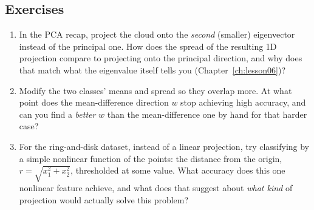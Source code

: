 \subsection*{Exercises}
\begin{enumerate}
  \item In the PCA recap, project the cloud onto the \emph{second} (smaller) eigenvector instead of the principal one. How does the spread of the resulting 1D projection compare to projecting onto the principal direction, and why does that match what the eigenvalue itself tells you (Chapter~\ref{ch:lesson06})?
  \item Modify the two classes' means and spread so they overlap more. At what point does the mean-difference direction $w$ stop achieving high accuracy, and can you find a \emph{better} $w$ than the mean-difference one by hand for that harder case?
  \item For the ring-and-disk dataset, instead of a linear projection, try classifying by a simple nonlinear function of the points: the distance from the origin, $r=\sqrt{x_1^2+x_2^2}$, thresholded at some value. What accuracy does this one nonlinear feature achieve, and what does that suggest about \emph{what kind} of projection would actually solve this problem?
\end{enumerate}

\vfill
{}
